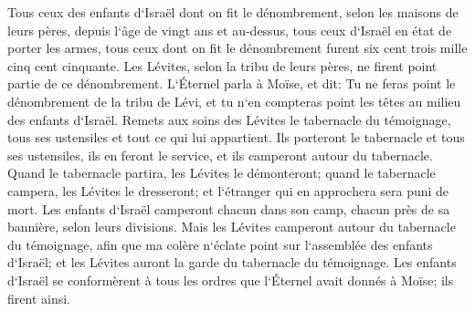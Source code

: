 \verse Tous ceux des enfants d`Israël dont on fit le dénombrement, selon les maisons de leurs pères, depuis l`âge de vingt ans et au-dessus, tous ceux d`Israël en état de porter les armes, 
\verse tous ceux dont on fit le dénombrement furent six cent trois mille cinq cent cinquante. 
\verse Les Lévites, selon la tribu de leurs pères, ne firent point partie de ce dénombrement. 
\verse L`Éternel parla à Moïse, et dit: 
\verse Tu ne feras point le dénombrement de la tribu de Lévi, et tu n`en compteras point les têtes au milieu des enfants d`Israël. 
\verse Remets aux soins des Lévites le tabernacle du témoignage, tous ses ustensiles et tout ce qui lui appartient. Ils porteront le tabernacle et tous ses ustensiles, ils en feront le service, et ils camperont autour du tabernacle. 
\verse Quand le tabernacle partira, les Lévites le démonteront; quand le tabernacle campera, les Lévites le dresseront; et l`étranger qui en approchera sera puni de mort. 
\verse Les enfants d`Israël camperont chacun dans son camp, chacun près de sa bannière, selon leurs divisions. 
\verse Mais les Lévites camperont autour du tabernacle du témoignage, afin que ma colère n`éclate point sur l`assemblée des enfants d`Israël; et les Lévites auront la garde du tabernacle du témoignage. 
\verse Les enfants d`Israël se conformèrent à tous les ordres que l`Éternel avait donnés à Moïse; ils firent ainsi. 

